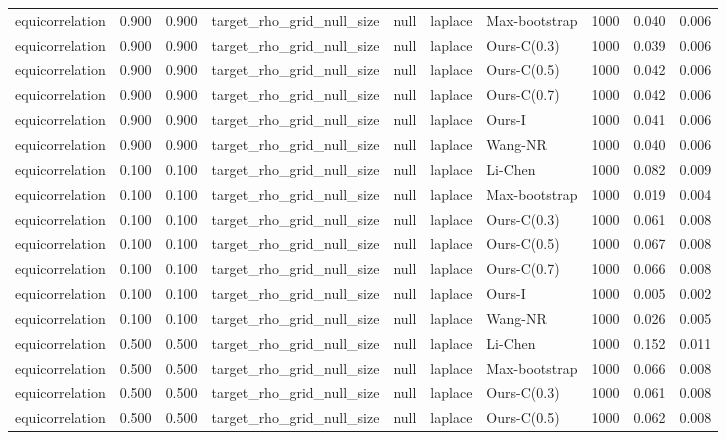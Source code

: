 \begin{tabular}{lrrllllrrr}
equicorrelation & 0.900 & 0.900 & target\_rho\_grid\_null\_size & null & laplace & Max-bootstrap & 1000 & 0.040 & 0.006 \\
equicorrelation & 0.900 & 0.900 & target\_rho\_grid\_null\_size & null & laplace & Ours-C(0.3) & 1000 & 0.039 & 0.006 \\
equicorrelation & 0.900 & 0.900 & target\_rho\_grid\_null\_size & null & laplace & Ours-C(0.5) & 1000 & 0.042 & 0.006 \\
equicorrelation & 0.900 & 0.900 & target\_rho\_grid\_null\_size & null & laplace & Ours-C(0.7) & 1000 & 0.042 & 0.006 \\
equicorrelation & 0.900 & 0.900 & target\_rho\_grid\_null\_size & null & laplace & Ours-I & 1000 & 0.041 & 0.006 \\
equicorrelation & 0.900 & 0.900 & target\_rho\_grid\_null\_size & null & laplace & Wang-NR & 1000 & 0.040 & 0.006 \\
equicorrelation & 0.100 & 0.100 & target\_rho\_grid\_null\_size & null & laplace & Li-Chen & 1000 & 0.082 & 0.009 \\
equicorrelation & 0.100 & 0.100 & target\_rho\_grid\_null\_size & null & laplace & Max-bootstrap & 1000 & 0.019 & 0.004 \\
equicorrelation & 0.100 & 0.100 & target\_rho\_grid\_null\_size & null & laplace & Ours-C(0.3) & 1000 & 0.061 & 0.008 \\
equicorrelation & 0.100 & 0.100 & target\_rho\_grid\_null\_size & null & laplace & Ours-C(0.5) & 1000 & 0.067 & 0.008 \\
equicorrelation & 0.100 & 0.100 & target\_rho\_grid\_null\_size & null & laplace & Ours-C(0.7) & 1000 & 0.066 & 0.008 \\
equicorrelation & 0.100 & 0.100 & target\_rho\_grid\_null\_size & null & laplace & Ours-I & 1000 & 0.005 & 0.002 \\
equicorrelation & 0.100 & 0.100 & target\_rho\_grid\_null\_size & null & laplace & Wang-NR & 1000 & 0.026 & 0.005 \\
equicorrelation & 0.500 & 0.500 & target\_rho\_grid\_null\_size & null & laplace & Li-Chen & 1000 & 0.152 & 0.011 \\
equicorrelation & 0.500 & 0.500 & target\_rho\_grid\_null\_size & null & laplace & Max-bootstrap & 1000 & 0.066 & 0.008 \\
equicorrelation & 0.500 & 0.500 & target\_rho\_grid\_null\_size & null & laplace & Ours-C(0.3) & 1000 & 0.061 & 0.008 \\
equicorrelation & 0.500 & 0.500 & target\_rho\_grid\_null\_size & null & laplace & Ours-C(0.5) & 1000 & 0.062 & 0.008 \\

\end{tabular}
